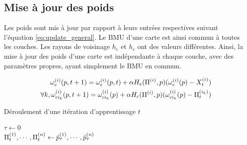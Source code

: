 \documentclass[../main]{subfiles}
\begin{document}
\subsection{Mise à jour des poids}

Les poids sont mis à jour par rapport à leurs entrées respectives suivant l'équation \ref{eq:update_general}. Le BMU d'une carte est ainsi commun à toutes les couches. 
Les rayons de voisinage $h_e$ et $h_c$ ont des valeurs différentes.
Ainsi, la mise à jour des poids d'une carte est indépendante à chaque couche, avec des paramètres propres, ayant simplement le BMU en commun.

\begin{align}\label{eq:update_general}
 \omega_{e}^{({i})}(p,t+1) = \omega_{e}^{({i})}(p,t) + \alpha H_{e}(\Pi^{({i})}, p)(\omega_{e}^{({i})}(p) - X_t^{({i})}) \\
\forall k, \omega_{ci_k}^{({i})}(p,t+1) = \omega_{ci_k}^{({i})}(p) + \alpha H_{c}(\Pi^{({i})},p)(\omega_{ci_k}^{({i})}(p) - \Pi^{({i_k})}_t)
\end{align}


\begin{algorithm}\label{algo:cxsom}
\caption{Déroulement d'une itération d'apprentissage $t$}
\SetAlgoLined
  $\tau \leftarrow 0$\\
  $\Pi^{({1})}_t, \cdots, \Pi^{({n})}_t \leftarrow \hat{p}^{({1})}_\tau, \cdots , \hat{p}^{({n})}_\tau$\\
 \end{algorithm}
 
\end{document}
